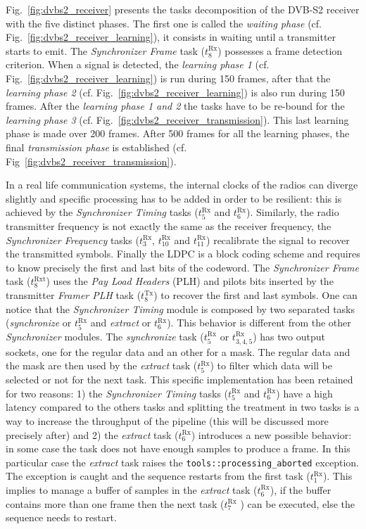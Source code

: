 Fig.~\ref{fig:dvbs2_receiver} presents the tasks decomposition of the DVB-S2
receiver with the five distinct phases. The first one is called the
\emph{waiting phase} (cf. Fig.~\ref{fig:dvbs2_receiver_learning}), it consists
in waiting until a transmitter starts to emit. The \emph{Synchronizer
Frame} task ($t^\text{Rx}_8$) possesses a frame detection criterion. When a
signal is detected, the \emph{learning phase 1} (cf.
Fig.~\ref{fig:dvbs2_receiver_learning}) is run during 150 frames, after that the
\emph{learning phase 2} (cf. Fig.~\ref{fig:dvbs2_receiver_learning}) is also run
during 150 frames. After the \emph{learning phase 1 and 2} the tasks have to be
re-bound for the \emph{learning phase 3}
(cf. Fig.~\ref{fig:dvbs2_receiver_transmission}). This last learning phase is
made over 200 frames. After 500 frames for all the learning phases, the final
\emph{transmission phase} is established (cf.
Fig~\ref{fig:dvbs2_receiver_transmission}).

In a real life communication systems, the internal clocks of the radios can
diverge slightly and specific processing has to be added in order to be
resilient: this is achieved by the \emph{Synchronizer Timing} tasks
($t^\text{Rx}_5$ and $t^\text{Rx}_6$). Similarly, the radio transmitter
frequency is not exactly the same as the receiver frequency, the
\emph{Synchronizer Frequency} tasks ($t^\text{Rx}_3$, $t^\text{Rx}_{10}$ and
$t^\text{Rx}_{11}$) recalibrate the signal to recover the transmitted symbols.
Finally the LDPC is a block coding scheme and requires to know precisely the
first and last bits of the codeword. The \emph{Synchronizer Frame} task
($t^\text{Rxt}_8$) uses the \emph{Pay Load Headers} (PLH) and pilots bits
inserted by the transmitter \emph{Framer PLH} task ($t^\text{Tx}_8$) to recover
the first and last symbols. One can notice that the \emph{Synchronizer Timing}
module is composed by two separated tasks (\emph{synchronize} or $t^\text{Rx}_5$
and \emph{extract} or $t^\text{Rx}_6$). This behavior is different from the
other \emph{Synchronizer} modules. The \emph{synchronize} task ($t^\text{Rx}_5$
or $t^\text{Rx}_{3,4,5}$) has two output sockets, one for the regular data and
an other for a mask. The regular data and the mask are then used by the
\emph{extract} task ($t^\text{Rx}_5$) to filter which data will be selected or
not for the next task. This specific implementation has been retained for two
reasons: 1) the \emph{Synchronizer Timing} tasks ($t^\text{Rx}_5$ and
$t^\text{Rx}_6$) have a high latency compared to the others tasks and splitting
the treatment in two tasks is a way to increase the throughput of the pipeline
(this will be discussed more precisely after) and 2) the \emph{extract} task
($t^\text{Rx}_6$) introduces a new possible behavior: in some case the task does
not have enough samples to produce a frame. In this particular case the
\emph{extract} task raises the \verb|tools::processing_aborted| exception. The
exception is caught and the sequence restarts from the first task
($t^\text{Rx}_1$). This implies to manage a buffer of samples in the
\emph{extract} task ($t^\text{Rx}_6$), if the buffer contains more than one
frame then the next task ($t^\text{Rx}_7$ ) can be executed, else the sequence
needs to restart.

